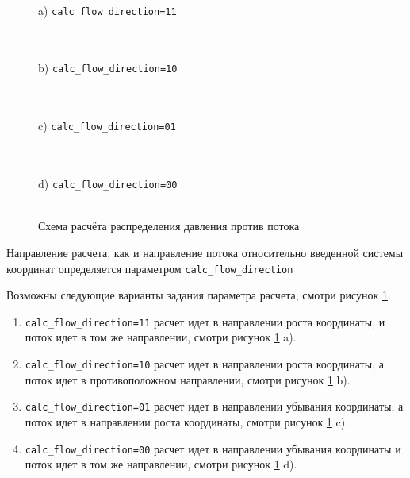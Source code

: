 \begin{figure}[H]
	\begin{minipage}[h]{0.48\linewidth}
		\centering 
		 \\a) \texttt{calc_flow_direction=11}\\ \ 
	\end{minipage}
	\hfill
	\begin{minipage}[h]{0.48\linewidth}
		\centering
		 \\b) \texttt{calc_flow_direction=10}\\ \ 
	\end{minipage}
	\vfill
	\begin{minipage}[h]{0.48\linewidth}
		\centering 
		 \\c) \texttt{calc_flow_direction=01}\\ \ 
	\end{minipage}
	\hfill
	\begin{minipage}[h]{0.48\linewidth}
		\centering 
		 \\d) \texttt{calc_flow_direction=00}\\ \ 
	\end{minipage}
	\caption{Схема расчёта распределения давления против потока}
	\label{ris:Pipe_scheme_1_4}
\end{figure}


Направление расчета, как и направление потока относительно введенной системы координат определяется параметром  \texttt{calc_flow_direction} 

Возможны следующие варианты задания параметра расчета, смотри рисунок \ref{ris:Pipe_scheme_1_4}.
\begin{enumerate}
	\item  \texttt{calc_flow_direction=11} расчет идет в направлении роста координаты, и поток идет в том же направлении, смотри рисунок \ref{ris:Pipe_scheme_1_4} a).
	
	\item  \texttt{calc_flow_direction=10} расчет идет в направлении роста координаты, а поток идет в противоположном направлении, смотри рисунок \ref{ris:Pipe_scheme_1_4} b).
	
	\item  \texttt{calc_flow_direction=01} расчет идет в направлении убывания координаты, а поток идет в направлении роста координаты, смотри рисунок \ref{ris:Pipe_scheme_1_4} c).
	
	\item  \texttt{calc_flow_direction=00} расчет идет в направлении убывания координаты и поток идет в том же направлении, смотри рисунок \ref{ris:Pipe_scheme_1_4} d).
\end{enumerate}


